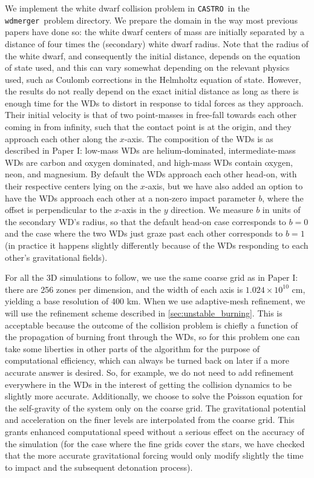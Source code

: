 \documentclass[twocolumn,numberedappendix]{../aastex6}
\newcommand{\castro}{\texttt{CASTRO}}
\newcommand{\wdmerger}{\texttt{wdmerger}}
\begin{document}
We implement the white dwarf collision problem in \castro\ in the \wdmerger\ problem
directory. We prepare the domain in the way most previous papers have done so:
the white dwarf centers of mass are initially separated by a distance of four times
the (secondary) white dwarf radius. Note that the radius of the white dwarf, and
consequently the initial distance, depends on the equation of state used, and this
can vary somewhat depending on the relevant physics used, such as Coulomb corrections
in the Helmholtz equation of state. However, the results do not really depend on the
exact initial distance as long as there is enough time for the WDs to distort in
response to tidal forces as they approach. Their initial velocity is that of
two point-masses in free-fall towards each other coming in from infinity, such that
the contact point is at the origin, and they approach each other along the $x$-axis.
The composition of the WDs is as described in Paper I: low-mass WDs are helium-dominated,
intermediate-mass WDs are carbon and oxygen dominated, and high-mass WDs contain
oxygen, neon, and magnesium. By default the WDs approach each other head-on, with
their respective centers lying on the $x$-axis, but we have also added an option
to have the WDs approach each other at a non-zero impact parameter $b$, where the
offset is perpendicular to the $x$-axis in the $y$ direction. We measure
$b$ in units of the secondary WD's radius, so that the default head-on case
corresponds to $b = 0$ and the case where the two WDs just graze past each other
corresponds to $b = 1$ (in practice it happens slightly differently because
of the WDs responding to each other's gravitational fields).

For all the 3D simulations to follow, we use the same coarse grid as in Paper I:
there are 256 zones per dimension, and the width of each axis is $1.024 \times 10^{10}$
cm, yielding a base resolution of 400 km. When we use adaptive-mesh refinement, we will
use the refinement scheme described in \autoref{sec:unstable_burning}. This is
acceptable because the outcome of the collision problem is chiefly a function
of the propagation of burning front through the WDs, so for this problem one
can take some liberties in other parts of the algorithm for the purpose of
computational efficiency, which can always be turned back on later if a more
accurate answer is desired. So, for example, we do not need to add refinement
everywhere in the WDs in the interest of getting the collision dynamics to be
slightly more accurate. Additionally, we choose to solve the Poisson equation
for the self-gravity of the system only on the coarse grid. The gravitational
potential and acceleration on the finer levels are interpolated from the coarse
grid. This grants enhanced computational speed without a serious effect on the
accuracy of the simulation (for the case where the fine grids cover the stars,
we have checked that the more accurate gravitational forcing would only modify
slightly the time to impact and the subsequent detonation process).
\end{document}
